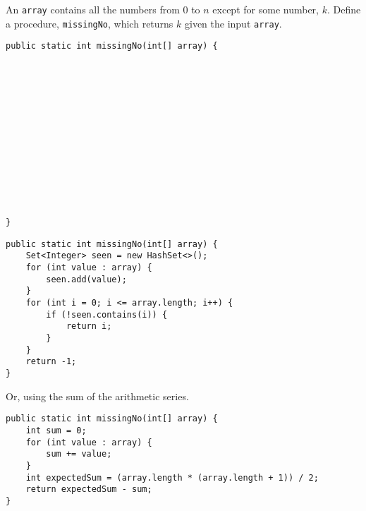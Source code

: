 \begin{blocksection}
\question An \lstinline$array$ contains all the numbers from $0$ to $n$ except
for some number, $k$. Define a procedure, \lstinline$missingNo$, which returns
$k$ given the input \lstinline$array$.

\ifprintanswers\else
\begin{lstlisting}
public static int missingNo(int[] array) {














}
\end{lstlisting}
\fi

\begin{solution}
\begin{lstlisting}
public static int missingNo(int[] array) {
    Set<Integer> seen = new HashSet<>();
    for (int value : array) {
        seen.add(value);
    }
    for (int i = 0; i <= array.length; i++) {
        if (!seen.contains(i)) {
            return i;
        }
    }
    return -1;
}
\end{lstlisting}

Or, using the sum of the arithmetic series.

\begin{lstlisting}
public static int missingNo(int[] array) {
    int sum = 0;
    for (int value : array) {
        sum += value;
    }
    int expectedSum = (array.length * (array.length + 1)) / 2;
    return expectedSum - sum;
}
\end{lstlisting}
\end{solution}
\end{blocksection}
